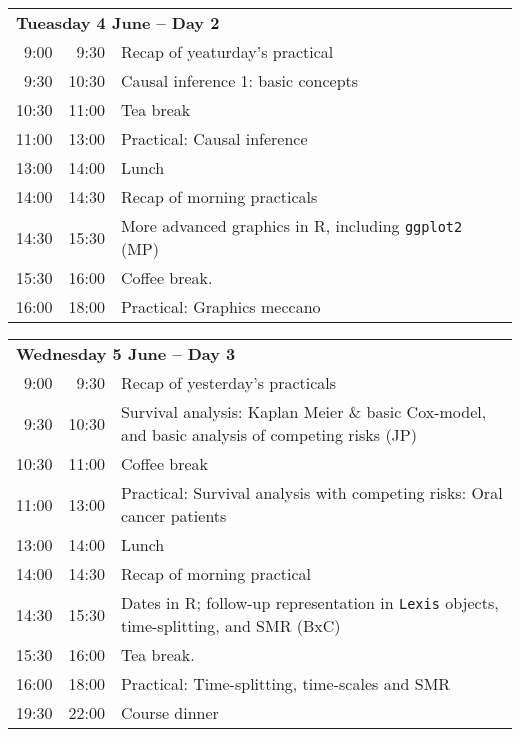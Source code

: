 \documentclass[a4paper, 12pt]{article}
\begin{document}
\noindent
\begin{tabular}{r@{ -- }rp{13cm}}
\multicolumn{3}{l}{\bf Tueasday 4 June -- Day 2} \\
9:00 & 9:30 & Recap of yeaturday's practical \\
9:30 & 10:30 & Causal inference 1: basic concepts\\ %
10:30 & 11:00 & Tea break\\
11:00 & 13:00 & Practical: Causal inference\\[1em] %
13:00 & 14:00 & Lunch \\
14:00 &  14:30 & Recap of morning practicals \\
14:30 & 15:30 & More advanced graphics in R, including
                \texttt{ggplot2} (MP)\\ %
15:30 & 16:00 & Coffee break. \\
16:00 & 18:00 & Practical: Graphics meccano \\[1em]%
\end{tabular}

\noindent
\begin{tabular}{r@{ -- }rp{13cm}}
\multicolumn{3}{l}{\bf Wednesday 5 June -- Day 3} \\
 9:00 &  9:30 & Recap of yesterday's practicals \\
 9:30 & 10:30 & Survival analysis: Kaplan Meier \& basic
                Cox-model, and basic analysis of competing risks (JP)\\ %
10:30 & 11:00 & Coffee break\\
11:00 & 13:00 & Practical: Survival analysis with competing risks: Oral cancer patients\\ %
13:00 & 14:00 & Lunch \\
14:00 & 14:30 & Recap of morning practical \\
14:30 & 15:30 & Dates in R; follow-up representation in \texttt{Lexis} objects,
                time-splitting,  and SMR (BxC)\\
15:30 & 16:00 & Tea break. \\
16:00 & 18:00 & Practical: Time-splitting, time-scales and SMR\\[1em] %
19:30 & 22:00 & Course dinner \\[1em]
\end{tabular}
\end{document}
